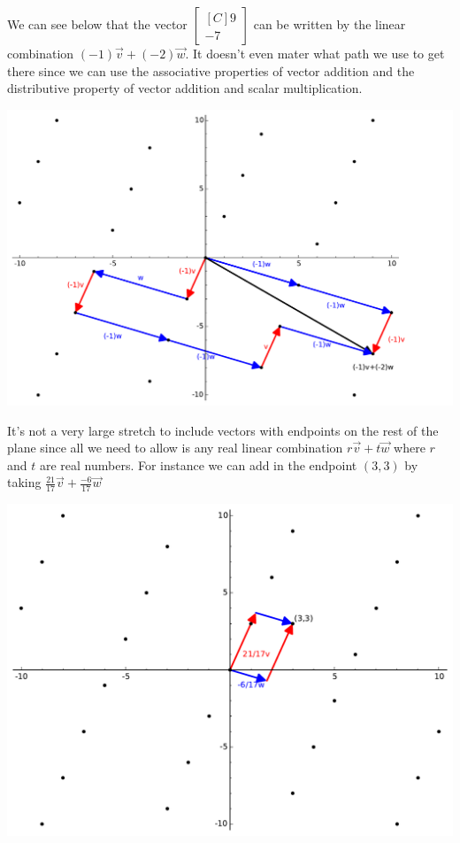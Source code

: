\begin{example}
We can see below that the vector $\begin{bmatrix*}[C]9 \\ -7 \end{bmatrix*}$ can be written by the linear combination $(-1)\vec{v}+(-2)\vec{w}$. It doesn't even mater what path we use to get there since we can use the associative properties of vector addition and the distributive property of vector addition and scalar multiplication.
\begin{center}
\includegraphics[scale=.5]{Rn/vw_9n7_graph1.pdf}
\end{center}

It's not a very large stretch to include vectors with endpoints on the rest of the plane since all we need to allow is any real linear combination $r\vec{v}+t\vec{w}$ where $r$ and $t$ are real numbers. For instance we can add in the endpoint $(3,3)$ by taking $\frac{21}{17}\vec{v}+\frac{-6}{17}\vec{w}$\\
\begin{center}
\includegraphics[scale=.5]{Rn/vw_graph2.pdf}\
\end{center}
\end{example}

